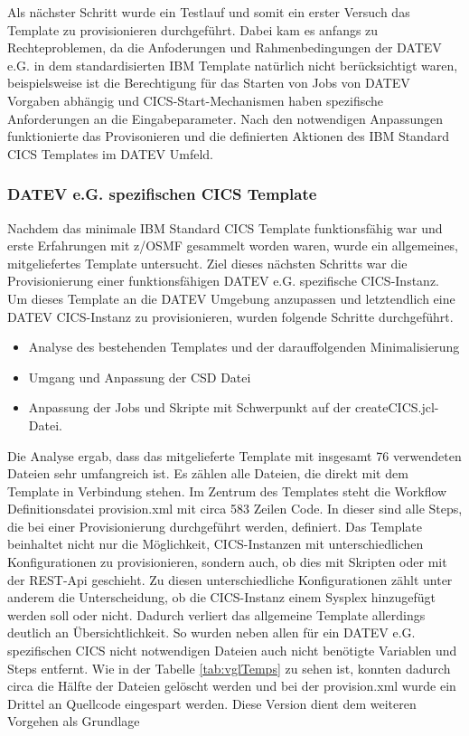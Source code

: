 Als nächster Schritt wurde ein Testlauf und somit ein erster Versuch das Template zu provisionieren durchgeführt.
Dabei kam es anfangs zu Rechteproblemen, da die Anfoderungen und Rahmenbedingungen der DATEV e.G. in dem standardisierten IBM Template natürlich nicht berücksichtigt waren, beispielsweise ist die Berechtigung für das Starten von Jobs von DATEV Vorgaben abhängig und CICS-Start-Mechanismen haben spezifische Anforderungen an die Eingabeparameter.
Nach den notwendigen Anpassungen funktionierte das Provisonieren und die definierten Aktionen des IBM Standard CICS Templates im DATEV Umfeld.

\subsubsection{DATEV e.G. spezifischen CICS Template}\label{sssec:datevcics}
Nachdem das minimale IBM Standard CICS Template funktionsfähig war und erste Erfahrungen mit z/OSMF gesammelt worden waren, wurde ein allgemeines, mitgeliefertes Template untersucht.
Ziel dieses nächsten Schritts war die Provisionierung einer funktionsfähigen DATEV e.G. spezifische CICS-Instanz.
Um dieses Template an die DATEV Umgebung anzupassen und letztendlich eine \glqq DATEV CICS-Instanz \grqq{} zu provisionieren, wurden folgende Schritte durchgeführt.

\begin{samepage}
\begin{itemize}
\item Analyse des bestehenden Templates und der darauffolgenden Minimalisierung
\item Umgang und Anpassung der CSD Datei
\item Anpassung der Jobs und Skripte mit Schwerpunkt auf der \glqq createCICS.jcl\grqq-Datei.
\end{itemize}
\end{samepage}

Die Analyse ergab, dass das mitgelieferte Template mit insgesamt 76 verwendeten Dateien sehr umfangreich ist.
Es zählen alle Dateien, die direkt mit dem Template in Verbindung stehen.
Im Zentrum des Templates steht die Workflow Definitionsdatei \glqq provision.xml \grqq{} mit circa 583 Zeilen Code.
In dieser sind alle Steps, die bei einer Provisionierung durchgeführt werden, definiert.
Das Template beinhaltet nicht nur die Möglichkeit, CICS-Instanzen mit unterschiedlichen Konfigurationen zu provisionieren, sondern auch, ob dies mit Skripten oder mit der REST-Api geschieht.
Zu diesen unterschiedliche Konfigurationen zählt unter anderem die Unterscheidung, ob die CICS-Instanz einem Sysplex hinzugefügt werden soll oder nicht.
Dadurch verliert das allgemeine Template allerdings deutlich an Übersichtlichkeit.
So wurden neben allen für ein DATEV e.G. spezifischen CICS nicht notwendigen Dateien auch nicht benötigte Variablen und Steps entfernt.
Wie in der Tabelle \ref{tab:vglTemps} zu sehen ist, konnten dadurch circa die Hälfte der Dateien gelöscht werden und bei der provision.xml wurde ein Drittel an Quellcode eingespart werden.
Diese Version dient dem weiteren Vorgehen als Grundlage

